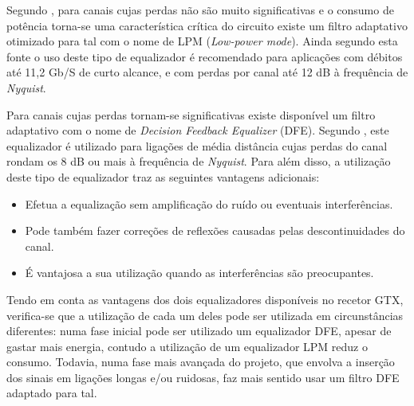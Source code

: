 Segundo \cite{R011}, para canais cujas perdas não são muito significativas e o consumo de potência torna-se uma característica crítica do circuito existe um filtro adaptativo otimizado para tal com o nome de LPM (\textit{Low-power mode}). Ainda segundo esta fonte o uso deste tipo de equalizador é recomendado para aplicações com débitos até 11,2 Gb/S de curto alcance, e com perdas por canal até 12 dB à frequência de \textit{Nyquist}.


Para canais cujas perdas tornam-se significativas existe disponível um filtro adaptativo com o nome de\textit{ Decision Feedback Equalizer} (DFE). 
Segundo \cite{R011}, este equalizador é utilizado para ligações de média distância cujas perdas do canal rondam os 8 dB ou mais à frequência de \textit{Nyquist}. Para além disso, a utilização deste tipo de equalizador traz as seguintes vantagens adicionais:
\begin{itemize}
	\item Efetua a equalização sem amplificação do ruído ou eventuais interferências.
	\item Pode também fazer correções de reflexões causadas pelas descontinuidades do canal. 
	\item É vantajosa a sua utilização quando as interferências são preocupantes.
\end{itemize}


Tendo em conta as vantagens dos dois equalizadores disponíveis no recetor GTX, verifica-se que a utilização de cada um deles pode ser utilizada em circunstâncias diferentes: numa fase inicial pode ser utilizado um equalizador DFE, apesar de gastar mais energia, contudo a utilização de um equalizador LPM reduz o consumo. Todavia, numa fase mais avançada do projeto, que envolva a inserção dos sinais em ligações longas e/ou ruidosas, faz mais sentido usar um filtro DFE adaptado para tal. 

%

